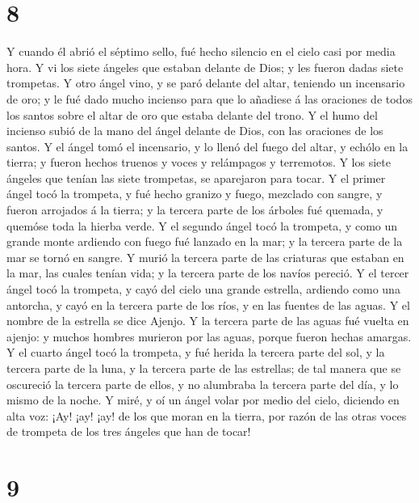 \hypertarget{section-7}{%
\section{8}\label{section-7}}

 Y cuando él abrió el séptimo sello, fué hecho silencio en
el cielo casi por media hora.  Y vi los siete ángeles que
estaban delante de Dios; y les fueron dadas siete trompetas.
 Y otro ángel vino, y se paró delante del altar, teniendo
un incensario de oro; y le fué dado mucho incienso para que lo añadiese
á las oraciones de todos los santos sobre el altar de oro que estaba
delante del trono.  Y el humo del incienso subió de la
mano del ángel delante de Dios, con las oraciones de los santos.
 Y el ángel tomó el incensario, y lo llenó del fuego del
altar, y echólo en la tierra; y fueron hechos truenos y voces y
relámpagos y terremotos.  Y los siete ángeles que tenían
las siete trompetas, se aparejaron para tocar.  Y el
primer ángel tocó la trompeta, y fué hecho granizo y fuego, mezclado con
sangre, y fueron arrojados á la tierra; y la tercera parte de los
árboles fué quemada, y quemóse toda la hierba verde.  Y el
segundo ángel tocó la trompeta, y como un grande monte ardiendo con
fuego fué lanzado en la mar; y la tercera parte de la mar se tornó en
sangre.  Y murió la tercera parte de las criaturas que
estaban en la mar, las cuales tenían vida; y la tercera parte de los
navíos pereció.  Y el tercer ángel tocó la trompeta, y
cayó del cielo una grande estrella, ardiendo como una antorcha, y cayó
en la tercera parte de los ríos, y en las fuentes de las aguas.
 Y el nombre de la estrella se dice Ajenjo. Y la tercera
parte de las aguas fué vuelta en ajenjo: y muchos hombres murieron por
las aguas, porque fueron hechas amargas.  Y el cuarto
ángel tocó la trompeta, y fué herida la tercera parte del sol, y la
tercera parte de la luna, y la tercera parte de las estrellas; de tal
manera que se oscureció la tercera parte de ellos, y no alumbraba la
tercera parte del día, y lo mismo de la noche.  Y miré, y
oí un ángel volar por medio del cielo, diciendo en alta voz: ¡Ay! ¡ay!
¡ay! de los que moran en la tierra, por razón de las otras voces de
trompeta de los tres ángeles que han de tocar!

\hypertarget{section-8}{%
\section{9}\label{section-8}}

